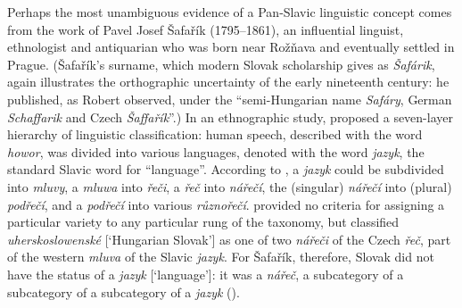 Perhaps the most unambiguous evidence of a Pan-Slavic linguistic concept comes from the work of Pavel Josef Šafařík (1795--1861), an influential linguist, ethnologist and antiquarian who was born near Rožňava and eventually settled in Prague. (Šafařík’s surname, which modern Slovak scholarship gives as \textit{Šafárik}, again illustrates the orthographic uncertainty of the early nineteenth century: he published, as Robert \citet[215]{pynsent_questions_1994} observed, under the “semi-Hungarian name \textit{Safáry}, German \textit{Schaffarik} and Czech \textit{Šaffařík}”.) In an \citeyear{safarik_slowansky_1842} ethnographic study, \citeauthor{safarik_slowansky_1842} proposed a seven-layer hierarchy of linguistic classification: human speech, described with the word \textit{howor}, was divided into various languages, denoted with the word \textit{jazyk}, the standard Slavic word for “language”. According to \citet[3]{safarik_slowansky_1842}, a \textit{jazyk} could be subdivided into \textit{mluvy}, a \textit{mluwa} into \textit{řeči}, a \textit{řeč} into \textit{nářečí}, the (singular) \textit{nářečí} into (plural) \textit{podřečí}, and a \textit{podřečí} into various \textit{různořečí}. \citet[5--6]{safarik_slowansky_1842} provided no criteria for assigning a particular variety to any particular rung of the taxonomy, but classified \textit{uherskoslowenské} [‘Hungarian Slovak’] as one of two \textit{nářeči} of the Czech \textit{řeč}, part of the western \textit{mluva} of the Slavic \textit{jazyk}. For Šafařík, therefore, Slovak did not have the status of a \textit{jazyk} [‘language’]: it was a \textit{nářeč}, a subcategory of a subcategory of a subcategory of a \textit{jazyk} (\cite[738--739]{maxwell_objectivefacts_2023}).

